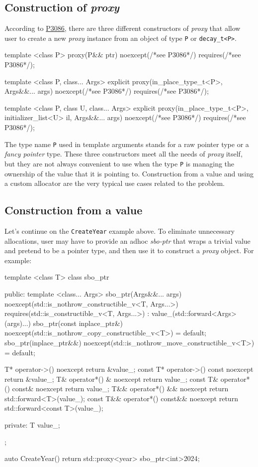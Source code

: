 \documentclass[10pt, a4paper, oneside]{article}
\begin{document}
\subsection{Construction of \textit{proxy}}
According to \href{https://wg21.link/p3086}{P3086},
there are three different constructors of \textit{proxy} that allow user to create a new \textit{proxy} instance from an object of type \verb|P| or \verb|decay_t<P>|.
\begin{codeblock}
template <class P>
proxy(P&& ptr) noexcept(/*see P3086*/) requires(/*see P3086*/);

template <class P, class... Args>
explicit proxy(in_place_type_t<P>, Args&&... args)
  noexcept(/*see P3086*/) requires(/*see P3086*/);

template <class P, class U, class... Args>
explicit proxy(in_place_type_t<P>, initializer_list<U> il,
  Args&&... args)
  noexcept(/*see P3086*/) requires(/*see P3086*/);
\end{codeblock}
The type name \verb|P| used in template arguments stands for a raw pointer type or a \textit{fancy pointer} type.
These three constructors meet all the needs of \textit{proxy} itself,
but they are not always convenient to use when the type \verb|P| is managing the ownership of the value that it is pointing to.
Construction from a value and using a custom allocator are the very typical use cases related to the problem.

\subsection{Construction from a value}
Let's continue on the \verb|CreateYear| example above.
To eliminate unnecessary allocations, user may have to provide an adhoc \textit{sbo-ptr} that wraps a trivial value and pretend to be a pointer type,
and then use it to construct a \textit{proxy} object.
For example:
\begin{codeblock}
template <class T>
class sbo_ptr {
 public:
  template <class... Args>
  sbo_ptr(Args&&... args)
      noexcept(std::is_nothrow_constructible_v<T, Args...>)
      requires(std::is_constructible_v<T, Args...>)
      : value_(std::forward<Args>(args)...) {}
  sbo_ptr(const inplace_ptr&)
      noexcept(std::is_nothrow_copy_constructible_v<T>) = default;
  sbo_ptr(inplace_ptr&&)
      noexcept(std::is_nothrow_move_constructible_v<T>) = default;

  T* operator->() noexcept { return &value_; }
  const T* operator->() const noexcept { return &value_; }
  T& operator*() & noexcept { return value_; }
  const T& operator*() const& noexcept { return value_; }
  T&& operator*() && noexcept { return std::forward<T>(value_); }
  const T&& operator*() const&& noexcept
      { return std::forward<const T>(value_); }

 private:
  T value_;
};

auto CreateYear() {
  return std::proxy<year>{
    sbo_ptr<int>{2024}};
}
\end{codeblock}
\end{document}
